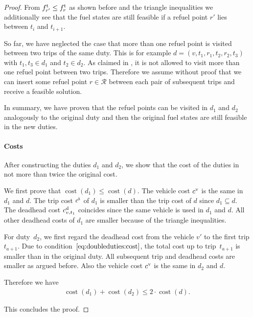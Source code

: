 \begin{proof}
From $f^{\operatorname{t}}_{r'}\leq f^{\operatorname{t}}_{r}$ as shown before and the triangle inequalities we additionally see that the fuel states are still feasible if a refuel point $r'$ lies between $t_i$ and $t_{i+1}$.

So far, we have neglected the case that more than one refuel point is visited between two trips of the same duty. This is for example ${d=\left(v,t_1,r_1,t_2,r_2,t_3\right)}$ with ${t_1,t_3\in d_1}$ and ${t_2\in d_2}$. As claimed in , it is not allowed to visit more than one refuel point between two trips. Therefore we assume without proof that we can insert some refuel point ${r\in\mathcal{R}}$ between each pair of subsequent trips and receive a feasible solution.

In summary, we have proven that the refuel points can be visited in $d_1$ and $d_2$ analogously to the original duty and then the original fuel states are still feasible in the new duties.

\paragraph{Costs} \proofparfill

After constructing the duties $d_1$ and $d_2$, we show that the cost of the duties in not more than twice the original cost.

We first prove that ${\operatorname{cost}\left(d_1\right)\leq\operatorname{cost}\left(d\right)}$. The vehicle cost $c^{\operatorname{v}}$ is the same in $d_1$ and $d$. The trip cost $c^{\operatorname{t}}$ of $d_1$ is smaller than the trip cost of $d$ since ${d_1\subseteq d}$. The deadhead cost $c^{\operatorname{d}}_{v,t_1}$ coincides since the same vehicle is used in $d_1$ and $d$. All other deadhead costs of $d_1$ are smaller because of the triangle inequalities.

For duty~$d_2$, we first regard the deadhead cost from the vehicle $v'$ to the first trip $t_{a+1}$. Due to condition~$\eqref{eq:doubleduties:cost}$, the total cost up to trip~$t_{a+1}$ is smaller than in the original duty. All subsequent trip and deadhead costs are smaller as argued before. Also the vehicle cost $c^{\operatorname{v}}$ is the same in $d_2$ and $d$.

Therefore we have
\begin{align*}
	\operatorname{cost}\left(d_1\right)+\operatorname{cost}\left(d_2\right)\leq 2\cdot\operatorname{cost}\left(d\right).
\end{align*}

This concludes the proof.

\end{proof}

